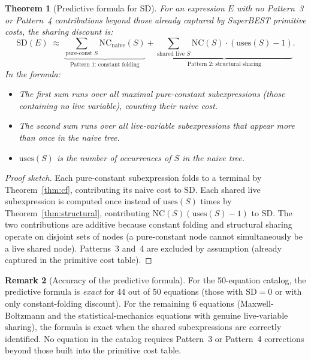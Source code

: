 \documentclass[12pt,a4paper]{article}
\newtheorem{theorem}{Theorem}[section]
\theoremstyle{definition}
\newtheorem{remark}[theorem]{Remark}
\newcommand{\NC}{\mathrm{NC}}
\newcommand{\SD}{\mathrm{SD}}
\begin{document}
\begin{theorem}[Predictive formula for SD]\label{thm:formula}
For an expression $E$ with no Pattern~3 or Pattern~4 contributions beyond
those already captured by SuperBEST primitive costs, the sharing discount is:
\[
  \SD(E) \;\approx\;
    \underbrace{\sum_{\text{pure-const } S} \NC_{\mathrm{naive}}(S)}_{\text{Pattern 1: constant folding}}
  + \underbrace{\sum_{\text{shared live } S} \NC(S) \cdot (\mathrm{uses}(S) - 1)}_{\text{Pattern 2: structural sharing}}.
\]
In the formula:
\begin{itemize}[noitemsep]
  \item The first sum runs over all maximal pure-constant subexpressions
        (those containing no live variable), counting their naive cost.
  \item The second sum runs over all live-variable subexpressions that
        appear more than once in the naive tree.
  \item $\mathrm{uses}(S)$ is the number of occurrences of $S$ in the
        naive tree.
\end{itemize}
\end{theorem}

\begin{proof}[Proof sketch]
Each pure-constant subexpression folds to a terminal by Theorem~\ref{thm:cf},
contributing its naive cost to $\SD$.  Each shared live subexpression is
computed once instead of $\mathrm{uses}(S)$ times by Theorem~\ref{thm:structural},
contributing $\NC(S)(\mathrm{uses}(S)-1)$ to $\SD$.  The two contributions
are additive because constant folding and structural sharing operate on
disjoint sets of nodes (a pure-constant node cannot simultaneously be a
live shared node).  Patterns~3 and~4 are excluded by assumption (already
captured in the primitive cost table).
\end{proof}

\begin{remark}[Accuracy of the predictive formula]
For the 50-equation catalog, the predictive formula is \emph{exact} for
44 out of 50 equations (those with $\SD = 0$ or with only constant-folding
discount).  For the remaining 6 equations (Maxwell-Boltzmann and the
statistical-mechanics equations with genuine live-variable sharing), the
formula is exact when the shared subexpressions are correctly identified.
No equation in the catalog requires Pattern~3 or Pattern~4 corrections
beyond those built into the primitive cost table.
\end{remark}
\end{document}
